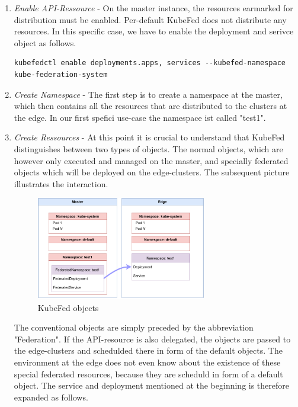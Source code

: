 \documentclass[MSC,Master,english]{twbook}%
\begin{document}
\begin{enumerate}
    \item \textit{Enable API-Ressource} - On the master instance, the resources earmarked for distribution must be enabled. Per-default KubeFed does not distribute any resources. In this specific case, we have to enable the deployment and serivce object as follows.
    \begin{lstlisting}[caption={Enable federation},captionpos=b]
        kubefedctl enable deployments.apps, services --kubefed-namespace kube-federation-system
    \end{lstlisting}
    \item \textit{Create Namespace} - The first step is to create a namespace at the master, which then contains all the resources that are distributed to the clusters at the edge. In our first spefici use-case the namespace ist called "test1".
    \item \textit{Create Ressources} - At this point it is crucial to understand that KubeFed distinguishes between two types of objects. The normal objects, which are however only executed and managed on the master, and specially federated objects which will be deployed on the edge-clusters. The subsequent picture illustrates the interaction.
    \begin{figure}[ht]
        \centering
        \includegraphics[width=0.70\textwidth]{PICs/drawio/kubefed-ressources.drawio.pdf}
        \caption{KubeFed objects}
        \label{fig:kubefed-resources}
    \end{figure} \medbreak
    The conventional objects are simply preceded by the abbreviation "Federation". If the API-resource is also delegated, the objects are passed to the edge-clusters and schedulded there in form of the default objects. The environment at the edge does not even know about the existence of these special federated resources, because they are scheduld in form of a default object. The service and deployment mentioned at the beginning is therefore expanded as follows.

\end{enumerate}
\end{document}
